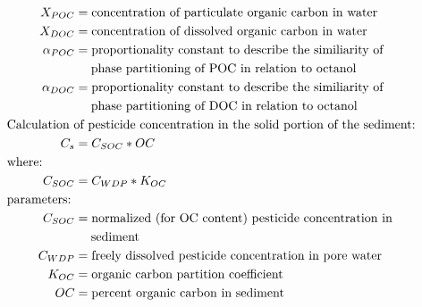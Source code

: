 \documentclass[10pt]{article}
\begin{document}
\begin{align*}
X_{POC} & = \text{concentration of particulate organic carbon in water} \nonumber \\
X_{DOC} & = \text{concentration of dissolved organic carbon in water} \nonumber \\
\alpha_{POC} & = \text{proportionality constant to describe the similiarity of}\nonumber\\ &\hspace{1.3em} \text{phase partitioning of POC in relation to octanol}\nonumber\\
\alpha_{DOC} & = \text{proportionality constant to describe the similiarity of}\nonumber\\ &\hspace{1.3em} \text{phase partitioning of DOC in relation to octanol}\nonumber\\
&    \hspace{-.75in}  \text{Calculation of pesticide concentration in the solid portion of the sediment:} \nonumber \\
C_{s} & = C_{SOC} * OC \nonumber \\
&    \hspace{-.75in}  \text{where:} \nonumber \\
C_{SOC} & = C_{WDP} * K_{OC}\nonumber \\
&    \hspace{-.75in}  \text{parameters:} \nonumber \\
C_{SOC} & = \text{normalized (for OC content) pesticide concentration in}\nonumber \\ &\hspace{1.3em} \text{sediment} \nonumber \\
C_{WDP} & = \text{freely dissolved pesticide concentration in pore water} \nonumber \\
K_{OC} & = \text{organic carbon partition coefficient} \nonumber\\
OC & = \text{percent organic carbon in sediment} \nonumber\\
\end{align*}
\end{document}

